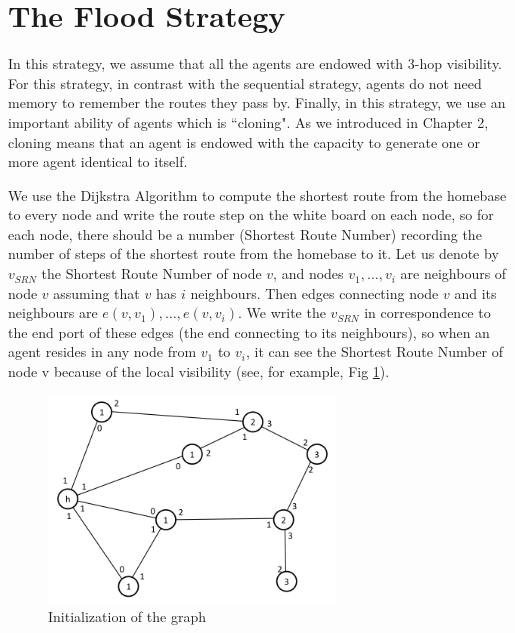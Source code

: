 \section{The Flood Strategy}
In this strategy, we assume that all the agents are endowed with 3-hop visibility. For this strategy, in contrast with the sequential strategy, agents   do not need memory to remember the routes they pass by.  Finally, in this strategy, we use an important ability of agents which is ``cloning". As we introduced in Chapter 2, cloning means that an agent is endowed with the capacity to generate one or more agent identical to itself. 

We use the Dijkstra Algorithm to compute the shortest route from the homebase to every node and write the route step on the white board on each node, so for each node, there should be a number (Shortest Route Number) recording the number of steps of the shortest route from the homebase to it. Let us denote by $v_{SRN}$ the Shortest Route Number of node $v$, and nodes ${v_1, \ldots, v_i}$ are neighbours of node $v$ assuming that $v$ has $i$ neighbours. Then edges connecting node $v$ and its neighbours are $e(v, v_1), \ldots, e(v, v_i)$. We write the $v_{SRN}$ in correspondence to the   end port of these edges (the end connecting to its neighbours), so when an agent resides in any node from $v_1$ to $v_i$, it can see the Shortest Route Number of node v because of the local visibility (see, for example,   Fig \ref{fig:Arbi1}).

\begin{figure}[H]
  \centering  
  \includegraphics[width=3in]{figures/Arbi1.png}
  \caption{Initialization of the graph}\label{fig:Arbi1}
\end{figure}

